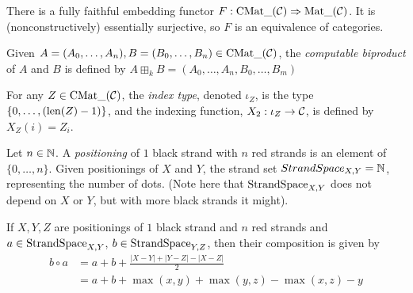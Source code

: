   There is a fully faithful embedding functor $F: \operatorname{CMat\_}(\mathcal{C}) \Rightarrow \operatorname{Mat\_} (\mathcal{C})$.
  It is (nonconstructively) essentially surjective, so $F$ is an equivalence
  of categories.
\begin{definition}
  Given $A = (A_0, \ldots, A_n), B=(B_0, \ldots, B_n)\in \operatorname{CMat\_}(\mathcal{C})$, the
  \emph{computable biproduct} of $A$ and $B$ is defined by $A\boxplus_k B = (A_0, \ldots, A_n, B_0, \ldots, B_m)$
\end{definition}
\begin{definition}
  For any $Z\in \operatorname{CMat\_} (\mathcal{C})$, the \emph{index type}, denoted $\iota_Z$, is the type
  $\{ 0, \ldots, (\operatorname{len}(Z)-1)\}$, and the indexing function, $X_2: \iota_Z\to \mathcal{C}$,
  is defined by $X_Z(i) = Z_i$.
\end{definition}

\begin{definition}
  Let $n\in \mathbb{N}$. A \emph{positioning} of $1$ black strand with $n$ red strands is
  an element of $\{0, \ldots, n\}$. Given positionings of $X$
  and $Y$, the strand set $StrandSpace_{X, Y} = \mathbb{N}$, representing
  the number of dots. (Note here that $\text{StrandSpace}_{X, Y}$ does not depend on
  $X$ or $Y$, but with more black strands it might).
\end{definition}

\begin{definition}
  If $X, Y, Z$ are positionings of $1$ black strand and $n$ red strands
  and $a\in \text{StrandSpace}_{X, Y}$, $b\in \text{StrandSpace}_{Y, Z}$, then their
  composition is given by
  \begin{align*}
    b\circ a &= a + b + \frac{|X-Y| + |Y-Z| - |X-Z|}{2}
    \\ &= a + b + \max (x, y) + \max (y, z) - \max (x, z) - y
  \end{align*}
\end{definition}

